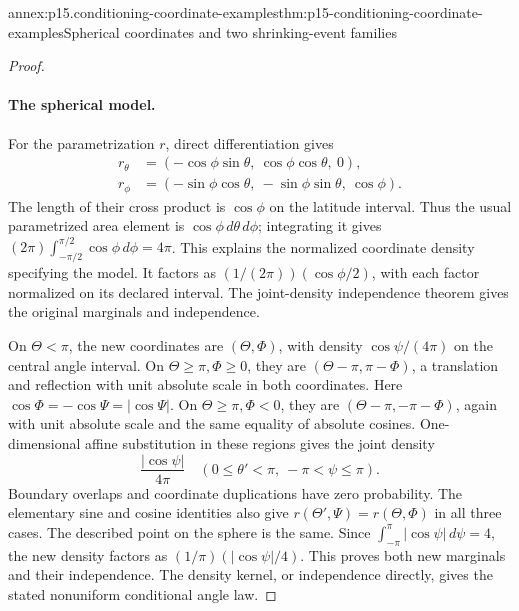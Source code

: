 \begin{annexitem}{annex:p15.conditioning-coordinate-examples}{thm:p15-conditioning-coordinate-examples}{Spherical coordinates and two shrinking-event families}
\begin{proof}
\paragraph{The spherical model.}
For the parametrization \(r\), direct differentiation gives
\[
 \begin{aligned}
 r_\theta&=(-\cos\phi\sin\theta,\ \cos\phi\cos\theta,\ 0),\\
 r_\phi&=(-\sin\phi\cos\theta,\ -\sin\phi\sin\theta,\ \cos\phi).
 \end{aligned}
\]
The length of their cross product is \(\cos\phi\) on the latitude
interval. Thus the usual parametrized area element is
\(\cos\phi\,d\theta\,d\phi\); integrating it gives
\((2\pi)\int_{-\pi/2}^{\pi/2}\cos\phi\,d\phi=4\pi\).
This explains the normalized coordinate density specifying the model.
It factors as \((1/(2\pi))(\cos\phi/2)\), with each factor
normalized on its declared interval.
The joint-density independence theorem gives the original
marginals and independence.

On \(\Theta<\pi\), the new coordinates are \((\Theta,\Phi)\),
with density \(\cos\psi/(4\pi)\) on the central angle interval.
On \(\Theta\geq\pi,\Phi\geq0\), they are
\((\Theta-\pi,\pi-\Phi)\), a translation and reflection with
unit absolute scale in both coordinates.
Here \(\cos\Phi=-\cos\Psi=|\cos\Psi|\).
On \(\Theta\geq\pi,\Phi<0\), they are
\((\Theta-\pi,-\pi-\Phi)\), again with unit absolute scale
and the same equality of absolute cosines.
One-dimensional affine substitution in these regions gives
the joint density
\[
            \frac{|\cos\psi|}{4\pi}
                \quad(0\leq\theta'<\pi,\ -\pi<\psi\leq\pi).
\]
Boundary overlaps and coordinate duplications have zero probability.
The elementary sine and cosine identities also give
\(r(\Theta',\Psi)=r(\Theta,\Phi)\) in all three cases.
The described point on the sphere is the same.
Since \(\int_{-\pi}^{\pi}|\cos\psi|\,d\psi=4\), the new density
factors as \((1/\pi)(|\cos\psi|/4)\).
This proves both new marginals and their independence.
The density kernel, or independence directly, gives the stated
nonuniform conditional angle law.


\end{proof}
\end{annexitem}
